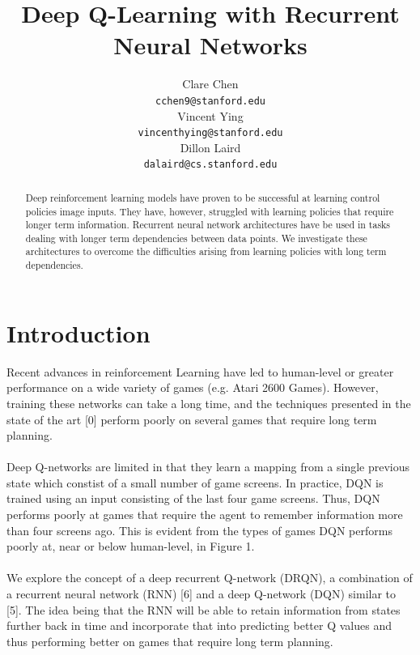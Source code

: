 \documentclass{article}
\title{Deep Q-Learning with Recurrent Neural Networks}
\author{
  Clare Chen \\
  \texttt{cchen9@stanford.edu} \\
  \And
  Vincent Ying \\
  \texttt{vincenthying@stanford.edu} \\
  \And
  Dillon Laird \\
  \texttt{dalaird@cs.stanford.edu} \\
}
\begin{document}

\maketitle

\begin{abstract}
  Deep reinforcement learning models have proven to be successful at learning
  control policies image inputs. They have, however, struggled with learning
  policies that require longer term information. Recurrent neural network
  architectures have be used in tasks dealing with longer term dependencies
  between data points. We investigate these architectures to overcome the
  difficulties arising from learning policies with long term dependencies.
\end{abstract}

\section{Introduction}
    Recent advances in reinforcement Learning have led to human-level or greater
    performance on a wide variety of games (e.g. Atari 2600 Games). However,
    training these networks can take a long time, and the techniques presented in
    the state of the art [0] perform poorly on several games that require long
    term planning. \\
    \\
    Deep Q-networks are limited in that they learn a mapping from a single
    previous state which constist of a small number of game screens. In practice,
    DQN is trained using an input consisting of the last four game screens. Thus,
    DQN performs poorly at games that require the agent to remember information
    more than four screens ago. This is evident from the types of games DQN performs
    poorly at, near or below human-level, in Figure 1. \\
    \\
    We explore the concept of a deep recurrent Q-network (DRQN), a combination of
    a recurrent neural network (RNN) [6] and a deep Q-network (DQN) similar to [5].
    The idea being that the RNN will be able to retain information from states
    further back in time and incorporate that into predicting better Q values
    and thus performing better on games that require long term planning. \\
\end{document}
